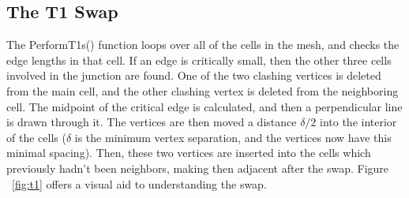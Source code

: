 \subsection{The T1 Swap}
The PerformT1s() function loops over all of the cells in the mesh, and checks the edge lengths in that cell. If an edge is critically small, then the other three cells involved in the junction are found. One of the two clashing vertices is deleted from the main cell, and the other clashing vertex is deleted from the neighboring cell. The midpoint of the critical edge is calculated, and then a perpendicular line is drawn through it. The vertices are then moved a distance $\delta/2$ into the interior of the cells ($\delta$ is the minimum vertex separation, and the vertices now have this minimal spacing). Then, these two vertices are inserted into the cells which previously hadn't been neighbors, making then adjacent after the swap. Figure ~\ref{fig:t1} offers a visual aid to understanding the swap. 

